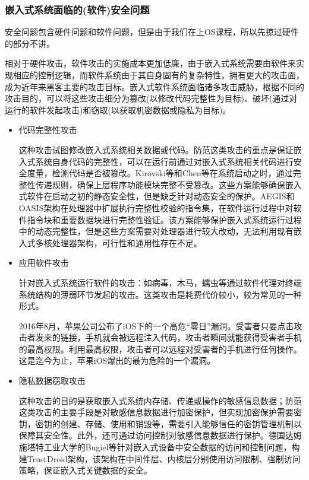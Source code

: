 \documentclass[12pt, a4paper]{article}
\begin{document}
	\subsubsection{嵌入式系统面临的(软件)安全问题}
	安全问题包含硬件问题和软件问题，但是由于我们在上OS课程，所以先掠过硬件的部分不讲。
	
	相对于硬件攻击，软件攻击的实施成本更加低廉，由于嵌入式系统需要由软件来实现相应的控制逻辑，而软件系统由于其自身固有的复杂特性，拥有更大的攻击面，成为近年来黑客主要的攻击目标。嵌入式软件系统面临诸多攻击威胁，根据不同的攻击目的，可以将这些攻击细分为篡改(以修改代码完整性为目标)、破坏(通过对运行的软件发起攻击)和窃取(以获取机密数据或隐私为目标)。
	
	\begin{itemize}
	\item 代码完整性攻击
	
	这种攻击试图修改嵌入式系统相关数据或代码。防范这类攻击的重点是保证嵌入式系统自身代码的完整性，可以在运行前通过对嵌入式系统相关代码进行安全度量，检测代码是否被篡改。Kirovski等和Chen等在系统启动之时，通过完整性传递规则，确保上层程序功能模块完整不受篡改。这些方案能够确保嵌入式软件在启动之初的静态安全性，但是缺乏针对动态安全的保护。AEGIS和OASIS架构在处理器中扩展执行完整性校验的指令集，在软件运行过程中对软件指令块和重要数据块进行完整性验证。该方案能够保护嵌入式系统运行过程中的动态完整性，但是这些方案需要对处理器进行较大改动，无法利用现有嵌入式多核处理器架构，可行性和通用性存在不足。
	
	\item 应用软件攻击
	
	针对嵌入式系统运行软件的攻击：如病毒，木马，蠕虫等通过软件代理对终端系统结构的薄弱环节发起的攻击。这类攻击是耗费代价较小，较为常见的一种形式。
	
	2016年8月，苹果公司公布了iOS下的一个高危“零日”漏洞。受害者只要点击攻击者发来的链接，手机就会被远程注入代码，攻击者瞬间就能获得受害者手机的最高权限。利用最高权限，攻击者可以远程对受害者的手机进行任何操作。这是迄今为止，苹果iOS爆出的最为危险的一个漏洞。
	
	\item 隐私数据窃取攻击
	
	这种攻击的目的是获取嵌入式系统内存储、传递或操作的敏感信息数据；防范这类攻击的主要手段是对敏感信息数据进行加密保护，但实现加密保护需要密钥，密钥的创建、存储、使用和销毁等，需要引入能够信任的密钥管理机制以保障其安全性。此外，还可通过访问控制对敏感信息数据进行保护。德国达姆施塔特工业大学的Bugiel等针对嵌入式设备中安全数据的访问和控制问题，构建TrustDroid架构，该架构在中间件层、内核层分别使用访问限制、强制访问策略，保证嵌入式关键数据的安全。
	\end{itemize}
	
\end{document}
